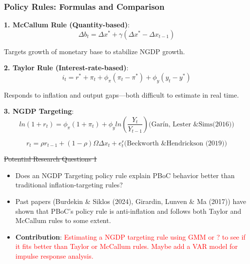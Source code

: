 \documentclass{beamer}
\begin{document}
\begin{frame}
\frametitle{Policy Rules: Formulas and Comparison}

\textbf{1. McCallum Rule (Quantity-based)}:
\[
\Delta b_t = \Delta x^* + \gamma (\Delta x^* - \Delta x_{t-1})
\]

Targets growth of monetary base to stabilize NGDP growth.

\textbf{2. Taylor Rule (Interest-rate-based)}:
\[
i_t = r^* + \pi_t + \phi_\pi (\pi_t - \pi^*) + \phi_y (y_t - y^*)
\]

Responds to inflation and output gaps—both difficult to estimate in real time.

\textbf{3. NGDP Targeting}:
\[
ln(1+r_t)=\phi_\pi(1+\pi_t)+\phi_y ln (\frac{Y_t}{Y_{t-1}}) \text{(Garín, Lester \& Sims(2016))}
\]

\[
r_t=\rho r_{t-1}+(1-\rho)\Omega\Delta x_t +e_t^r \text{(Beckworth \& Hendrickson (2019))}
\]



\end{frame}

\begin{frame}{\sout{Potential Research Questions 1}}
  \begin{itemize}
    \item Does an NGDP Targeting policy rule explain PBoC behavior better than traditional inflation-targeting rules?
    \item Past papers (Burdekin \& Siklos (2024), Girardin, Lunven \& Ma (2017)) have shown that PBoC's policy rule is anti-inflation and follows both Taylor and McCallum rules to some extent.
    \item \textbf{Contribution}: \textcolor{red}{Estimating a NGDP targeting rule using GMM or ? to see if it fits better than Taylor or McCallum rules. Maybe add a VAR model for impulse response analysis.}
  \end{itemize}
\end{frame}
\end{document}
